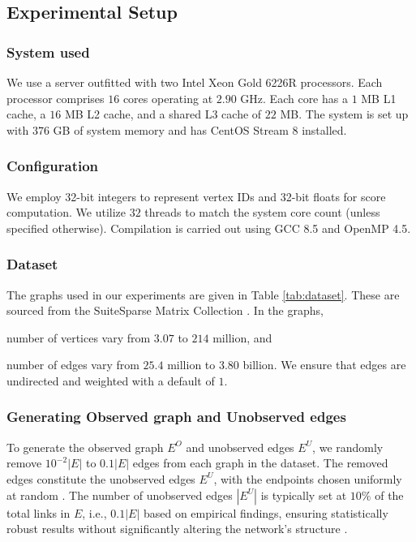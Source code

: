 \subsection{Experimental Setup}
\label{sec:setup}

\subsubsection{System used}

We use a server outfitted with two Intel Xeon Gold 6226R processors. Each processor comprises $16$ cores operating at $2.90$ GHz. Each core has a $1$ MB L1 cache, a $16$ MB L2 cache, and a shared L3 cache of $22$ MB. The system is set up with $376$ GB of system memory and has CentOS Stream 8 installed.


\subsubsection{Configuration}

We employ 32-bit integers to represent vertex IDs and 32-bit floats for score computation. We utilize $32$ threads to match the system core count (unless specified otherwise). Compilation is carried out using GCC 8.5 and OpenMP 4.5.


\subsubsection{Dataset}

The graphs used in our experiments are given in Table \ref{tab:dataset}. These are sourced from the SuiteSparse Matrix Collection \cite{suite19}. In the graphs, number of vertices vary from $3.07$ to $214$ million, and number of edges vary from $25.4$ million to $3.80$ billion. We ensure that edges are undirected and weighted with a default of $1$.




\subsubsection{Generating Observed graph and Unobserved edges}
\label{sec:generate-batch}

To generate the observed graph $E^O$ and unobserved edges $E^U$, we randomly remove $10^{-2}|E|$ to $0.1|E|$ edges from each graph in the dataset. The removed edges constitute the unobserved edges $E^U$, with the endpoints chosen uniformly at random \cite{zhou2021progresses}. The number of unobserved edges $|E^U|$ is typically set at $10\%$ of the total links in $E$, i.e., $0.1|E|$ based on empirical findings, ensuring statistically robust results without significantly altering the network's structure \cite{lu2015toward}.


